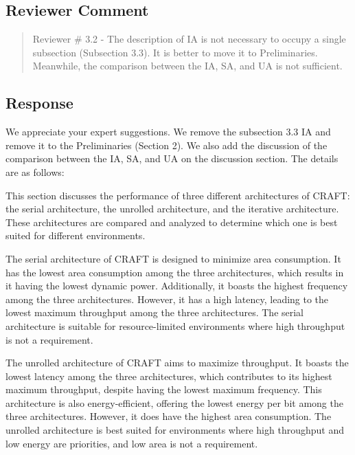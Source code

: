 \subsection{Reviewer Comment}
\begin{mdframed}
	\begin{quote}
		Reviewer \# 3.2 - The description of IA is not necessary to occupy a single subsection (Subsection 3.3). It is better to move it to Preliminaries. Meanwhile, the comparison between the IA, SA, and UA is not sufficient.
	\end{quote}
\end{mdframed}

\subsection{Response}

We appreciate your expert suggestions. We remove the subsection 3.3 IA and remove it to the Preliminaries (Section 2). We also add the discussion of the comparison between the IA, SA, and UA on the discussion section. The details are as follows:

\color{blue}
This section discusses the performance of three different architectures of CRAFT: the serial architecture, the unrolled architecture, and the iterative architecture. These architectures are compared and analyzed to determine which one is best suited for different environments.

The serial architecture of CRAFT is designed to minimize area consumption. It has the lowest area consumption among the three architectures, which results in it having the lowest dynamic power. Additionally, it boasts the highest frequency among the three architectures. However, it has a high latency, leading to the lowest maximum throughput among the three architectures. The serial architecture is suitable for resource-limited environments where high throughput is not a requirement.

The unrolled architecture of CRAFT aims to maximize throughput. It boasts the lowest latency among the three architectures, which contributes to its highest maximum throughput, despite having the lowest maximum frequency. This architecture is also energy-efficient, offering the lowest energy per bit among the three architectures. However, it does have the highest area consumption. The unrolled architecture is best suited for environments where high throughput and low energy are priorities, and low area is not a requirement.

